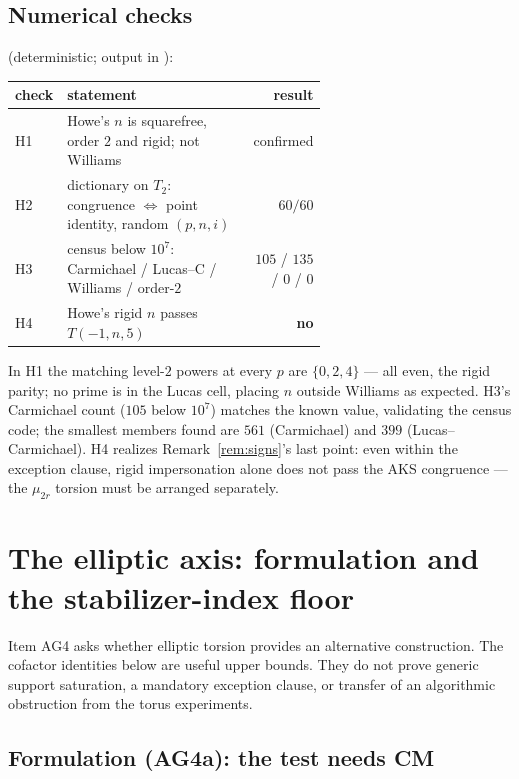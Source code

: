 \documentclass[11pt]{article}
\theoremstyle{remark}
\begin{document}
\subsection{Numerical checks}\label{sec:hiernumerics}

 (deterministic; output in
):

\begin{center}
\begin{tabular}{@{}lp{0.62\linewidth}r@{}}
\hline
check & statement & result \\
\hline
H1 & Howe's $n$ is squarefree, order $2$ and rigid; not Williams &
confirmed \\
H2 & dictionary on $T_2$: congruence $\iff$ point identity, random
$(p,n,i)$ & $60/60$ \\
H3 & census below $10^7$: Carmichael / Lucas--C / Williams / order-$2$ &
$105$ / $135$ / $0$ / $0$ \\
H4 & Howe's rigid $n$ passes $T(-1,n,5)$ & \textbf{no} \\
\hline
\end{tabular}
\end{center}

In H1 the matching level-$2$ powers at every $p$ are $\{0,2,4\}$ --- all
even, the rigid parity; no prime is in the Lucas cell, placing $n$ outside
Williams as expected. H3's Carmichael count ($105$ below $10^7$) matches
the known value, validating the census code; the smallest members found
are $561$ (Carmichael) and $399$ (Lucas--Carmichael). H4 realizes
Remark~\ref{rem:signs}'s last point: even within the exception clause,
rigid impersonation alone does not pass the AKS congruence --- the
$\mu_{2r}$ torsion must be arranged separately.

\section{The elliptic axis: formulation and the stabilizer-index floor}
\label{sec:elliptic}

Item AG4 asks whether elliptic torsion provides an alternative construction.
The cofactor identities below are useful upper bounds. They do not prove
generic support saturation, a mandatory exception clause, or transfer of an
algorithmic obstruction from the torus experiments.

\subsection{Formulation (AG4a): the test needs CM}
\end{document}
